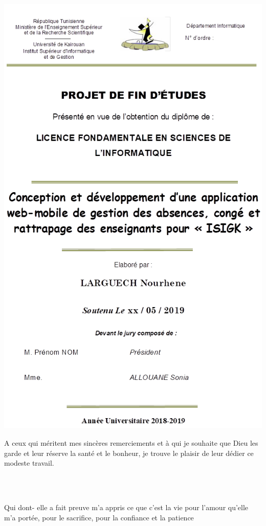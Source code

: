 \documentclass[12 pt]{report}
\begin{document}
\includegraphics[width=16cm,height=22cm]{pdg.png}
\thispagestyle{empty}
\newpage
\thispagestyle{empty}
\begin{center}


\Huge\textbf{\selectfont {Dédicace}}
\end{center}


 A ceux qui méritent mes sincères remerciements et à qui je souhaite que Dieu les garde et leur réserve la santé et le bonheur, je trouve le plaisir de leur dédier ce modeste travail.
\\
\\
\begin{center}
\Large{}\selectfont {A}\\
\Large\textbf{\selectfont {Ma famille}}
\end{center}
 Qui dont- elle a fait preuve m’a appris ce que c’est la vie pour l’amour qu’elle m'a portée, pour le sacrifice, pour la confiance et la patience 
\end{document}
